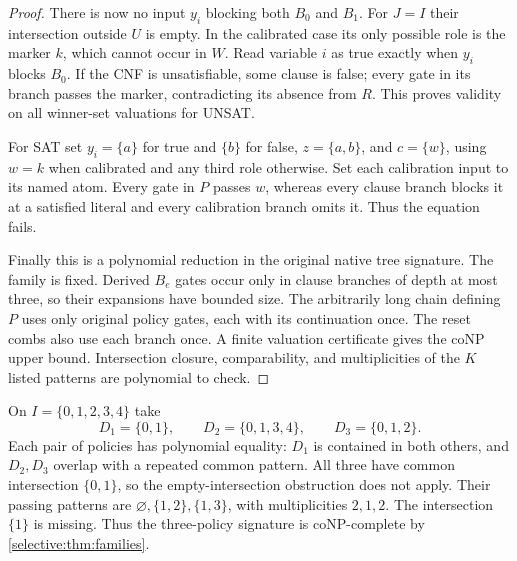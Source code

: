 \begin{proof}
There is now no input $y_i$ blocking both $B_0$ and $B_1$.
For $J=I$ their intersection outside $U$ is empty. In the calibrated
case its only possible role is the marker $k$, which cannot occur
in $W$. Read variable $i$ as true exactly when $y_i$ blocks $B_0$.
If the CNF is unsatisfiable, some clause is false; every gate in its
branch passes the marker, contradicting its absence from $R$.
This proves validity on all winner-set valuations for UNSAT.

For SAT set $y_i=\{a\}$ for true and $\{b\}$ for false,
$z=\{a,b\}$, and $c=\{w\}$, using $w=k$ when calibrated and
any third role otherwise. Set each calibration input to its named
atom. Every gate in $P$ passes $w$, whereas every clause branch
blocks it at a satisfied literal and every calibration branch
omits it. Thus the equation fails.

Finally this is a polynomial reduction in the original native tree
signature. The family is fixed. Derived $B_e$ gates occur only in
clause branches of depth at most three, so their expansions have
bounded size. The arbitrarily long chain defining $P$ uses only
original policy gates, each with its continuation once. The reset
combs also use each branch once. A finite valuation certificate
gives the coNP upper bound. Intersection closure, comparability,
and multiplicities of the $K$ listed patterns are polynomial to check.
\end{proof}

\begin{example}
On $I=\{0,1,2,3,4\}$ take
\[
 D_1=\{0,1\},\qquad D_2=\{0,1,3,4\},\qquad D_3=\{0,1,2\}.
\]
Each pair of policies has polynomial equality: $D_1$ is contained in
both others, and $D_2,D_3$ overlap with a repeated common pattern.
All three have common intersection $\{0,1\}$, so the empty-intersection
obstruction does not apply. Their passing patterns are
$\varnothing,\{1,2\},\{1,3\}$, with multiplicities $2,1,2$.
The intersection $\{1\}$ is missing. Thus the three-policy signature
is coNP-complete by \cref{selective:thm:families}.
\end{example}
